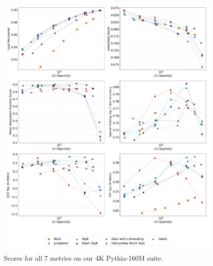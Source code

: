 \documentclass{article}
\theoremstyle{plain}
\theoremstyle{definition}
\theoremstyle{remark}
\begin{document}
\begin{figure}[h!]
    \centering
    \includegraphics[width=\columnwidth]{images/plot_2x4_sae_bench_pythia-160m_4k_architecture_series_layer_8.png}
    \caption{Scores for all 7 metrics on our 4K Pythia-160M suite.}
\end{figure}
\label{fig:plot_2x4_sae_bench_pythia-160m_4k_architecture_series_layer_8}
\end{document}
